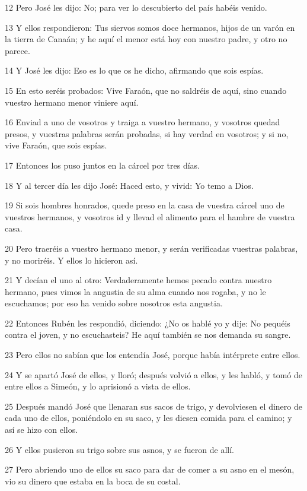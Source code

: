 12 Pero José les dijo: No; para ver lo descubierto del país habéis venido.

13 Y ellos respondieron: Tus siervos somos doce hermanos, hijos de un varón en la tierra de Canaán; y he aquí el menor está hoy con nuestro padre, y otro no parece.

14 Y José les dijo: Eso es lo que os he dicho, afirmando que sois espías.

15 En esto seréis probados: Vive Faraón, que no saldréis de aquí, sino cuando vuestro hermano menor viniere aquí.

16 Enviad a uno de vosotros y traiga a vuestro hermano, y vosotros quedad presos, y vuestras palabras serán probadas, si hay verdad en vosotros; y si no, vive Faraón, que sois espías.

17 Entonces los puso juntos en la cárcel por tres días.

18 Y al tercer día les dijo José: Haced esto, y vivid: Yo temo a Dios.

19 Si sois hombres honrados, quede preso en la casa de vuestra cárcel uno de vuestros hermanos, y vosotros id y llevad el alimento para el hambre de vuestra casa.

20 Pero traeréis a vuestro hermano menor, y serán verificadas vuestras palabras, y no moriréis. Y ellos lo hicieron así.

21 Y decían el uno al otro: Verdaderamente hemos pecado contra nuestro hermano, pues vimos la angustia de su alma cuando nos rogaba, y no le escuchamos; por eso ha venido sobre nosotros esta angustia.

22 Entonces Rubén les respondió, diciendo: ¿No os hablé yo y dije: No pequéis contra el joven, y no escuchasteis? He aquí también se nos demanda su sangre.

23 Pero ellos no sabían que los entendía José, porque había intérprete entre ellos.

24 Y se apartó José de ellos, y lloró; después volvió a ellos, y les habló, y tomó de entre ellos a Simeón, y lo aprisionó a vista de ellos.

25 Después mandó José que llenaran sus sacos de trigo, y devolviesen el dinero de cada uno de ellos, poniéndolo en su saco, y les diesen comida para el camino; y así se hizo con ellos.

26 Y ellos pusieron su trigo sobre sus asnos, y se fueron de allí.

27 Pero abriendo uno de ellos su saco para dar de comer a su asno en el mesón, vio su dinero que estaba en la boca de su costal.


